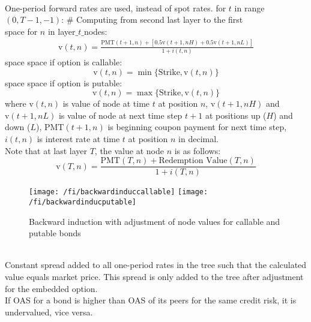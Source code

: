 \begin{method} \\
One-period forward rates are used, instead of spot rates.
for $t$ in range $(0, T-1, -1)$: \# Computing from second last layer to the first \\
{\color{white}space} for $n$ in layer$\_t\_$nodes:
\begin{align}
\text{v}(t,n) = \frac{\text{PMT}(t+1,n)+ [0.5 \text{v}(t+1, nH) + 0.5 \text{v}(t+1, nL)]}{1 + i(t, n)} \nonumber
\end{align}
{\color{white}space} {\color{white}space} if option is callable:
\begin{equation}
\text{v}(t,n) = \min \{\text{Strike}, \text{v}(t,n) \} \nonumber
\end{equation}
{\color{white}space} {\color{white}space} if option is putable:
\begin{equation}
\text{v}(t,n) = \max \{\text{Strike}, \text{v}(t,n) \} \nonumber
\end{equation}
where $\text{v}(t,n)$ is value of node at time $t$ at position $n$, $\text{v}(t+1,nH)$ and $\text{v}(t+1,nL)$ is value of node at next time step $t+1$ at positions up ($H$) and down ($L$), $\text{PMT}(t+1,n)$ is beginning coupon payment for next time step, $i(t,n)$ is interest rate at time $t$ at position $n$ in decimal. \\
Note that at last layer $T$, the value at node $n$ is as follows:
\begin{equation}
\text{v}(T, n) = \frac{\text{PMT}(T,n) + \text{Redemption Value}(T,n)}{1 + i(T, n)} \nonumber
\end{equation}
\end{method}

\begin{figure}[H]
\centering
\texttt{[image: /fi/backwardinduccallable]}
\texttt{[image: /fi/backwardinducputable]}
\caption{Backward induction with adjustment of node values for callable and putable bonds}
\end{figure}

\begin{remark} \\
Constant spread added to all one-period rates in the tree such that the calculated value equals market price. This spread is only added to the tree after adjustment for the embedded option.\\
If OAS for a bond is higher than OAS of its peers for the same credit risk, it is undervalued, vice versa.
\end{remark}

